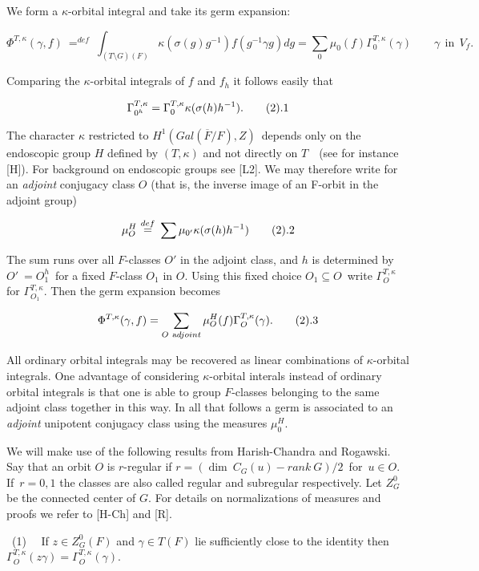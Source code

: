 We form a $\kappa$-orbital integral and take its germ expansion:

$$
\Phi^{T,\kappa}(\gamma,f)\ {\mathrel{\mathop =^{def}}}\  \int_{(T\setminus G)(F)}
\kappa(\sigma(g)g^{-1})f(g^{-1}\gamma g)dg  = \sum_0 \mu_0(f)\Gamma_0^{T,\kappa}(\gamma)
\qquad \gamma~~ {\text{in}}~~ V_f .
$$

\noindent  Comparing the $\kappa$-orbital integrals of  $f$  and  $f_h$  it follows
easily that
		     
$$
\Gamma^{T,\kappa}_{0^h} = \Gamma_0^{T,\kappa} \kappa(\sigma(h)h^{-1}) . \tag 2.1
$$

The character  $\kappa$  restricted to  $H^1(Gal(\overline{F}/F),Z)$\ depends only on
the endoscopic group  $H$  defined by  $(T,\kappa)$  and not directly on  $T$~~(see
for instance [H]).  For
background on endoscopic groups see [L2].  We may therefore write 
for an {\it adjoint} conjugacy class  $O$ (that is, the inverse image of an
F-orbit in the adjoint group)

$$
\mu^H_{O}\ {\mathrel{\mathop=^{def}}}\ 
\sum  \mu_{0'} \kappa(\sigma (h) h^{-1})     \tag 2.2
$$

\noindent The sum runs over all $F$-classes  $O'$  in the adjoint class, and  $h$  is
determined by  $O'\ = O_1^h$\ for a fixed $F$-class $O_1$ in $O$.  Using this fixed choice
$O_1 \subseteq O$\ write  $\Gamma_{O}^{T,\kappa}$  for  $\Gamma_{O_1}^{T,\kappa}$.  
Then the germ expansion becomes

$$
\Phi^{T,\kappa} (\gamma,f) = \sum_{O~{\text adjoint}} \mu^H_{O}(f)
\Gamma_{O}^{T,\kappa} (\gamma).  \tag 2.3
$$

\noindent  All ordinary orbital integrals may be recovered as linear combinations of
$\kappa$-orbital integrals.  One advantage of considering $\kappa$-orbital interals instead
of ordinary orbital   integrals is that one is able to group  $F$-classes belonging
to the same adjoint class together in this way.  In all that follows a germ is
associated to an {\it adjoint} unipotent conjugacy class using the measures
$\mu^H_0$.

We will make use of the following results from Harish-Chandra and Rogawski.  
Say that an orbit $O$  is $r$-regular if  $r = (\dim~C_G(u)-rank~G)/2$\  for\
$u\in O$.  If\ $r = 0,1$  the classes are also called regular and
subregular respectively.  Let  $Z^0_G$  be the connected center of  $G$.   For
details on normalizations of measures and proofs we refer to [H-Ch] and [R].

\proclaim{Proposition\ \ 2.4}\  (1)~~ If  $z\in Z^0_G(F)$  and  $\gamma\in T(F)$
lie sufficiently close to the identity then\ $\Gamma^{T,\kappa}_{O}(z\gamma)
= \Gamma^{T,\kappa}_{O}(\gamma)$.

